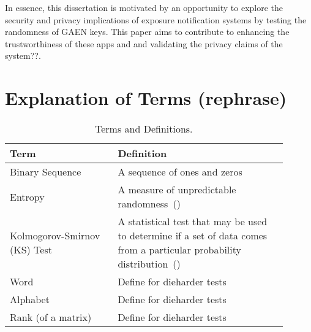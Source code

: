 In essence, this dissertation is motivated by an opportunity to explore the security and privacy implications of exposure notification systems by testing the randomness of GAEN keys. This paper aims to contribute to enhancing the trustworthiness of these apps and and validating the privacy claims of the system??.  



\section{Explanation of Terms (rephrase)}

\begin{table}[htbp]
\begin{tabular}{|p{0.35\linewidth}|p{0.55\linewidth}|}
\hline
\textbf{Term}               & \textbf{Definition}                                                                                               \\ \hline
Binary Sequence             & A sequence of ones and zeros                                                                                      \\ \hline
Entropy                     & A measure of unpredictable randomness~(\cite{zolfaghari2022odyssey})                                              \\ \hline
Kolmogorov-Smirnov (KS) Test    & A statistical test that may be used to determine if a set of data comes from a particular probability distribution~(\cite{nist}) \\ \hline
Word                        & Define for dieharder tests                                                                                         \\ \hline
Alphabet                    & Define for dieharder tests                                                                                         \\ \hline
Rank (of a matrix)         & Define for dieharder tests                                                                                         \\ \hline
\end{tabular}
\caption{Terms and Definitions.}
\label{table}
\end{table}
